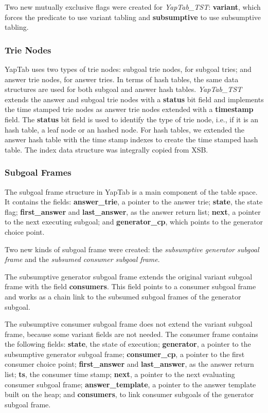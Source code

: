 Two new mutually exclusive flags were created for \textit{YapTab\_TST}: \textbf{variant},
which forces the predicate to use variant tabling and \textbf{subsumptive} to use subsumptive tabling.

\subsubsection{Trie Nodes}

YapTab uses two types of trie nodes: subgoal trie nodes, for subgoal tries; and answer trie nodes, for
answer tries. In terms of hash tables, the same data structures are used for both subgoal and answer
hash tables. \textit{YapTab\_TST} extends the answer and subgoal trie nodes with a \textbf{status}
bit field and implements the time stamped trie nodes as answer trie nodes extended with a \textbf{timestamp} field.
The \textbf{status} bit field is used to identify the type of trie node, i.e., if it is
an hash table, a leaf node or an hashed node.
For hash tables, we extended the answer hash table with the time stamp indexes to create the
time stamped hash table. The index data structure was integrally copied from XSB.

\subsubsection{Subgoal Frames}

The subgoal frame structure in YapTab is a main component of the table space.
It contains the fields: \textbf{answer\_trie}, a pointer to the answer trie;
\textbf{state}, the state flag; \textbf{first\_answer} and \textbf{last\_answer},
as the answer return list; \textbf{next}, a pointer to the next executing subgoal;
and \textbf{generator\_cp}, which points to the generator choice point.

Two new kinds of subgoal frame were created: the \textit{subsumptive generator subgoal frame} and
the \textit{subsumed consumer subgoal frame}.

The subsumptive generator subgoal frame extends the original variant subgoal frame
with the field \textbf{consumers}. This field points to a consumer subgoal frame and works
as a chain link to the subsumed subgoal frames of the generator subgoal.

The subsumptive consumer subgoal frame does not extend the variant subgoal frame, because
some variant fields are not needed.
The consumer frame contains the following fields: \textbf{state}, the state of execution;
\textbf{generator}, a pointer to the subsumptive generator subgoal frame; \textbf{consumer\_cp},
a pointer to the first consumer choice point; \textbf{first\_answer} and \textbf{last\_answer},
as the answer return list; \textbf{ts}, the consumer time stamp;
\textbf{next}, a pointer to the next evaluating consumer subgoal frame; \textbf{answer\_template},
a pointer to the answer template built on the heap; and \textbf{consumers},
to link consumer subgoals of the generator subgoal frame.

